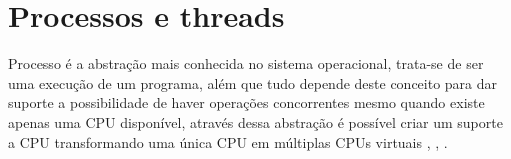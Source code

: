 \chapter{Processos e threads}\label{cap:ProcessosThreads}

Processo é a abstração mais conhecida no sistema operacional, trata-se de ser uma execução de um programa, além que tudo depende deste conceito para  dar suporte a possibilidade de haver operações concorrentes mesmo quando existe apenas uma CPU disponível, através dessa abstração é possível criar um suporte a CPU  transformando uma única CPU em múltiplas CPUs virtuais \cite{Tanenbaum2016}, \cite{info2020}, \cite{Morimoto2011}. 






